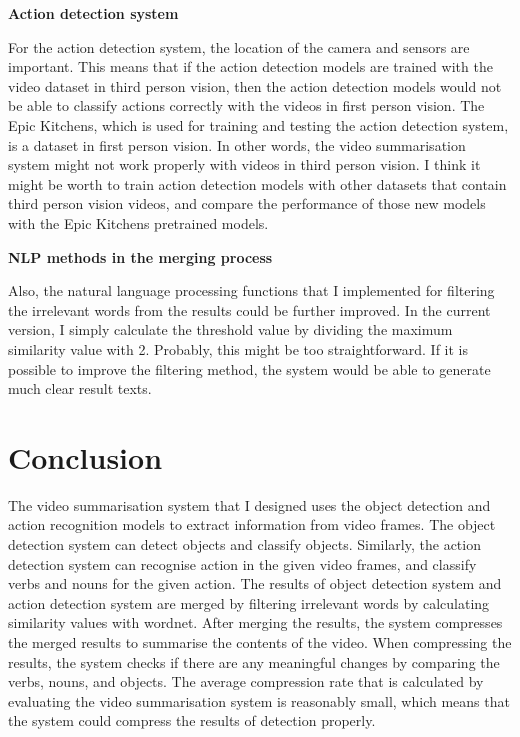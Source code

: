 \documentclass{article}
\begin{document}
\textbf{Action detection system}

For the action detection system, the location of the camera and sensors are important. This means that if the action detection models are trained with the video dataset in third person vision, then the action detection models would not be able to classify actions correctly with the videos in first person vision. The Epic Kitchens, which is used for training and testing the action detection system, is a dataset in first person vision. In other words, the video summarisation system might not work properly with videos in third person vision. I think it might be worth to train action detection models with other datasets that contain third person vision videos, and compare the performance of those new models with the Epic Kitchens pretrained models.\newline

\textbf{NLP methods in the merging process}

Also, the natural language processing functions that I implemented for filtering the irrelevant words from the results could be further improved. In the current version, I simply calculate the threshold value by dividing the maximum similarity value with 2. Probably, this might be too straightforward. If it is possible to improve the filtering method, the system would be able to generate much clear result texts.\newline

\section{Conclusion}

The video summarisation system that I designed uses the object detection and action recognition models to extract information from video frames. The object detection system can detect objects and classify objects. Similarly, the action detection system can recognise action in the given video frames, and classify verbs and nouns for the given action. The results of object detection system and action detection system are merged by filtering irrelevant words by calculating similarity values with wordnet. After merging the results, the system compresses the merged results to summarise the contents of the video. When compressing the results, the system checks if there are any meaningful changes by comparing the verbs, nouns, and objects. The average compression rate that is calculated by evaluating the video summarisation system is reasonably small, which means that the system could compress the results of detection properly.
\end{document}
